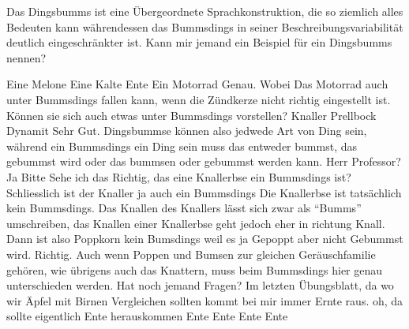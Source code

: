 \begin{verseplay}[3em]
\s\Prof {} Das Dingsbumms ist eine Übergeordnete Sprachkonstruktion, die so ziemlich alles Bedeuten kann währendessen das Bummsdings  in seiner Beschreibungsvariabilität deutlich eingeschränkter ist. Kann mir jemand ein Beispiel für ein Dingsbumms nennen?

\s\Studc Eine Melone 
\s\Studa Eine Kalte Ente 
\s\Studb Ein Motorrad 
\s\Prof Genau. Wobei Das Motorrad auch unter Bummsdings fallen kann, wenn die Zündkerze nicht richtig eingestellt ist. Können sie sich auch etwas unter Bummsdings vorstellen?
\s\Studa Knaller 
\s\Studb Prellbock 
\s\Gimli Dynamit 
\s\Prof Sehr Gut. Dingsbummse können also jedwede Art von Ding sein, während ein Bummsdings ein Ding sein muss das entweder bummst, das gebummst wird oder das bummsen oder gebummst werden kann. 
\s\Studb Herr Professor?
\s\Prof Ja Bitte
\s\Studb Sehe ich das Richtig, das eine Knallerbse ein Bummsdings ist? Schliesslich ist der Knaller ja auch ein Bummsdings
\s\Prof {} Die Knallerbse ist tatsächlich kein Bummsdings. Das Knallen des Knallers lässt sich zwar als ``Bumms'' umschreiben, das Knallen einer Knallerbse geht jedoch eher in richtung Knall.
\s\Studb Dann ist also Poppkorn kein Bumsdings weil es ja Gepoppt aber nicht Gebummst wird.
\s\Prof Richtig. Auch wenn Poppen und Bumsen zur gleichen Geräuschfamilie gehören, wie übrigens auch das Knattern, muss beim Bummsdings hier genau unterschieden werden. Hat noch jemand Fragen?
\s\Studa Im letzten Übungsblatt, da wo wir Äpfel mit Birnen Vergleichen sollten kommt bei mir immer Ernte raus.
\s\Prof oh, da sollte eigentlich Ente herauskommen  Ente Ente Ente Ente 
\end{verseplay}


\regie{}
